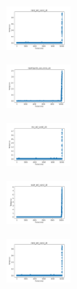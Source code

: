 \begin{figure}[H]
    \hfill
    \begin{subfigure}
        \centering
        \includegraphics[width=0.234\textwidth]{img/HS-LS-v2/rand_set_const_20_277451237_time.png}
    \end{subfigure}
    \hfill
    \begin{subfigure}
        \centering
        \includegraphics[width=0.234\textwidth]{img/HS-LS-v2/newthyroid_set_const_20_277451237_time.png}
    \end{subfigure}
    \hfill
    \begin{subfigure}
        \centering
        \includegraphics[width=0.234\textwidth]{img/HS-LS-v2/iris_set_const_20_49258669_time.png}
    \end{subfigure}
    \hfill
    \begin{subfigure}
        \centering
        \includegraphics[width=0.234\textwidth]{img/HS-LS-v2/ecoli_set_const_20_49258669_time.png}
    \end{subfigure}
    \hfill
    \begin{subfigure}
        \centering
        \includegraphics[width=0.234\textwidth]{img/HS-LS-v2/rand_set_const_20_49258669_time.png}
    \end{subfigure}
    \hfill
    \begin{subfigure}

\end{subfigure}
\end{figure}
